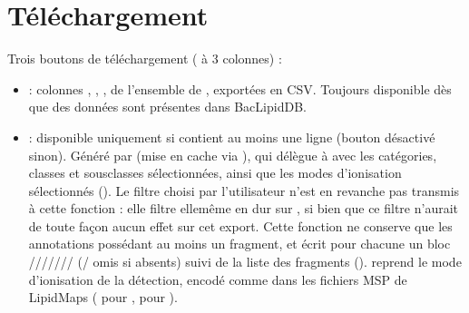 \documentclass[letterpaper,10pt,english]{sphinxmanual}
\begin{document}
\section{Téléchargement}
\label{\detokenize{3_Export:telechargement}}
\sphinxAtStartPar
Trois boutons de téléchargement ( à 3 colonnes) :
\begin{itemize}
\item {} 
\sphinxAtStartPar
{} : colonnes , , ,  de
l’ensemble de , exportées en CSV. Toujours disponible dès que des données sont présentes dans BacLipidDB.

\item {} 
\sphinxAtStartPar
{} : disponible uniquement si  contient au moins une ligne
 (bouton  désactivé sinon). Généré par  (mise en
cache via ), qui délègue à {\hyperref[\detokenize{api:utils.msp_export.generate_msp}]{}}
avec les catégories, classes et sous\sphinxhyphen{}classes sélectionnées,  ainsi que les
modes d’ionisation sélectionnés (). Le filtre 
choisi par l’utilisateur n’est en revanche pas transmis à cette fonction : elle filtre
elle\sphinxhyphen{}même en dur sur , si bien que ce filtre n’aurait de
toute façon aucun effet sur cet export. Cette fonction ne conserve que les annotations  possédant au moins un fragment, et écrit
pour chacune un bloc ///////
(/ omis si absents) suivi de la liste des fragments ().
 reprend le mode d’ionisation de la détection, encodé comme dans les fichiers
MSP de LipidMaps ( pour ,  pour ).


\end{itemize}
\end{document}
